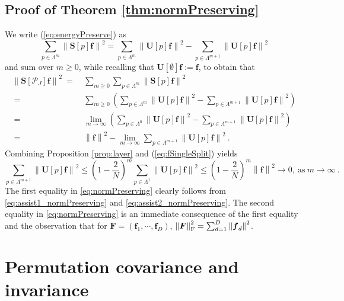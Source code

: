 \documentclass{article}
\def\cP{\mathcal{P}}
\def\BF{\boldsymbol{F}}
\def\BS{\boldsymbol{S}}
\def\BU{\boldsymbol{U}}
\def\Bf{\boldsymbol{f}}
\newcommand{\F}{\textup{\mbox{F}}}
\newcommand{\norm}[1]{\left\lVert#1\right\rVert}
\begin{document}
\subsection{Proof of Theorem \ref{thm:normPreserving}}
We write (\ref{eq:energyPreserve}) as
\begin{equation}
\sum_{p \in \Lambda^m} \norm{\BS[p] \Bf}^2 = \sum_{p \in \Lambda^m} \norm{\BU[p] \Bf}^2 - \sum_{p \in \Lambda^{m+1}} \norm{\BU[p] \Bf}^2
\end{equation}
and sum over $m \geq 0$, while recalling that $\BU[\emptyset]\Bf := \Bf$, to obtain that
\begin{equation}
\begin{aligned}
\label{eq:assist1_normPreserving}
\norm{\BS[\cP_J] \Bf}^2 ~=~ & \sum_{m \geq 0} \sum_{p \in \Lambda^m} \norm{\BS[p] \Bf}^2 \\
~=~ & \sum_{m \geq 0} \left( \sum_{p \in \Lambda^m} \norm{\BU[p] \Bf}^2 - \sum_{p \in \Lambda^{m+1}} \norm{\BU[p] \Bf}^2 \right) \\
~=~ & \lim_{m \rightarrow \infty} \left( \sum_{p \in \Lambda^0} \norm{\BU[p] \Bf}^2 - \sum_{p \in \Lambda^{m+1}} \norm{\BU[p] \Bf}^2 \right) \\
~=~ & \norm{\Bf}^2 - \lim_{m \rightarrow \infty} \sum_{p \in \Lambda^{m+1}} \norm{\BU[p] \Bf}^2 ~.
\end{aligned}
\end{equation}
Combining Proposition \ref{prop:layer} and (\ref{eq:fSingleSplit}) yields 
\begin{equation}
\label{eq:assist2_normPreserving}
\sum_{p \in \Lambda^{m+1}} \norm{\BU[p] \Bf}^2 \leq \left( 1-\frac{2}{N} \right)^m \sum_{p \in \Lambda^1} \norm{\BU[p] \Bf}^2 \leq  \left( 1-\frac{2}{N} \right)^m \norm{\Bf}^2 \rightarrow 0, ~\mbox{as}~ m \rightarrow \infty ~.        
\end{equation}
The first equality in \eqref{eq:normPreserving} clearly follows from \eqref{eq:assist1_normPreserving}
and \eqref{eq:assist2_normPreserving}. The second equality in \eqref{eq:normPreserving} is an immediate consequence of the first equality and the observation that for $\BF = (\Bf_1, \cdots, \Bf_D)$, $\norm{\BF}_{\F}^2 = \sum_{d=1}^D \norm{\Bf_d}^2$.


\section{Permutation covariance and invariance}\label{sec:shift}
\end{document}
